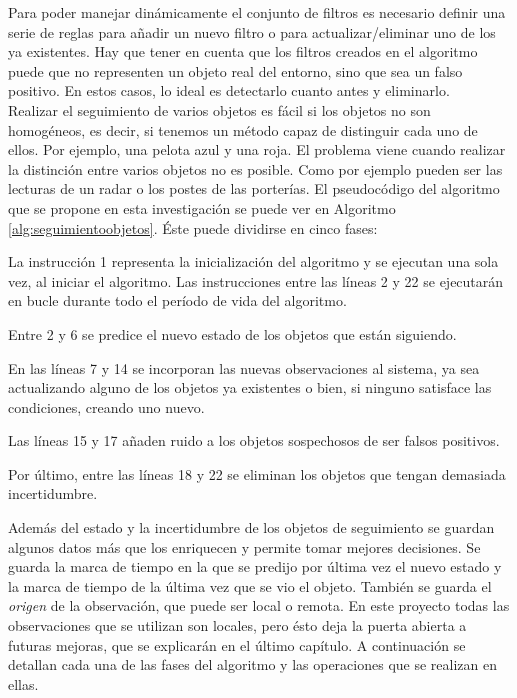 Para poder manejar dinámicamente el conjunto de filtros es necesario definir una serie de reglas para añadir un nuevo filtro o para actualizar/eliminar uno de los ya existentes. Hay que tener en cuenta que los filtros creados en el algoritmo puede que no representen un objeto real del entorno, sino que sea un falso positivo. En estos casos, lo ideal es detectarlo cuanto antes y eliminarlo.\\

Realizar el seguimiento de varios objetos es fácil si los objetos no son homogéneos, es decir, si tenemos un método capaz de distinguir cada uno de ellos. Por ejemplo, una pelota azul y una roja. El problema viene cuando realizar la distinción entre varios objetos no es posible. Como por ejemplo pueden ser las lecturas de un radar o los postes de las porterías. El pseudocódigo del algoritmo que se propone en esta investigación se puede ver en Algoritmo \ref{alg:seguimientoobjetos}. Éste puede dividirse en cinco fases:

\begin{packed_item}
\item La instrucción 1 representa la inicialización del algoritmo y se ejecutan una sola vez, al iniciar el algoritmo. Las instrucciones entre las líneas 2 y 22 se ejecutarán en bucle durante todo el período de vida del algoritmo.
\item Entre 2 y 6 se predice el nuevo estado de los objetos que están siguiendo.
\item En las líneas 7 y 14 se incorporan las nuevas observaciones al sistema, ya sea actualizando alguno de los objetos ya existentes o bien, si ninguno satisface las condiciones, creando uno nuevo.
\item Las líneas 15 y 17 añaden ruido a los objetos sospechosos de ser falsos positivos.
\item Por último, entre las líneas 18 y 22 se eliminan los objetos que tengan demasiada incertidumbre.
\end{packed_item}

Además del estado y la incertidumbre de los objetos de seguimiento se guardan algunos datos más que los enriquecen y permite tomar mejores decisiones. Se guarda la marca de tiempo en la que se predijo por última vez el nuevo estado y la marca de tiempo de la última vez que se vio el objeto. También se guarda el \textit{origen} de la observación, que puede ser local o remota. En este proyecto todas las observaciones que se utilizan son locales, pero ésto deja la puerta abierta a futuras mejoras, que se explicarán en el último capítulo. A continuación se detallan cada una de las fases del algoritmo y las operaciones que se realizan en ellas.\\

